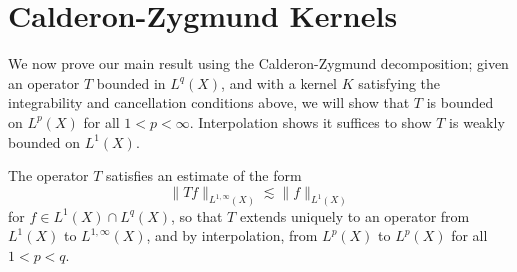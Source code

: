 \section{Calderon-Zygmund Kernels}

We now prove our main result using the Calderon-Zygmund decomposition; given an operator $T$ bounded in $L^q(X)$, and with a kernel $K$ satisfying the integrability and cancellation conditions above, we will show that $T$ is bounded on $L^p(X)$ for all $1 < p < \infty$. Interpolation shows it suffices to show $T$ is weakly bounded on $L^1(X)$.

\begin{theorem}
    The operator $T$ satisfies an estimate of the form
    \[ \| Tf \|_{L^{1,\infty}(X)} \lesssim \| f \|_{L^1(X)} \]
    for $f \in L^1(X) \cap L^q(X)$, so that $T$ extends uniquely to an operator from $L^1(X)$ to $L^{1,\infty}(X)$, and by interpolation, from $L^p(X)$ to $L^p(X)$ for all $1 < p < q$.
\end{theorem}
